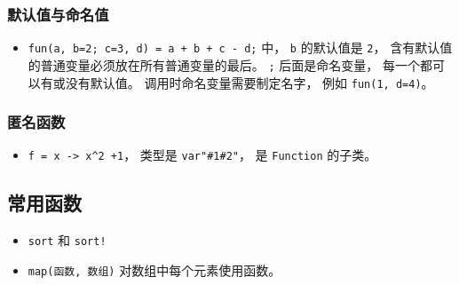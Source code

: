 \subsubsection{默认值与命名值}
\begin{itemize}
\item \verb|fun(a, b=2; c=3, d) = a + b + c - d;| 中， \verb|b| 的默认值是 \verb|2|， 含有默认值的普通变量必须放在所有普通变量的最后。 \verb|;| 后面是命名变量， 每一个都可以有或没有默认值。 调用时命名变量需要制定名字， 例如 \verb|fun(1, d=4)|。
\end{itemize}

\subsubsection{匿名函数}
\begin{itemize}
\item \verb|f = x -> x^2 +1|， 类型是 \verb|var"#1#2"|， 是 \verb|Function| 的子类。
\end{itemize}

\subsection{常用函数}
\begin{itemize}
\item \verb|sort| 和 \verb|sort!|
\item \verb|map(函数, 数组)| 对数组中每个元素使用函数。
\end{itemize}

